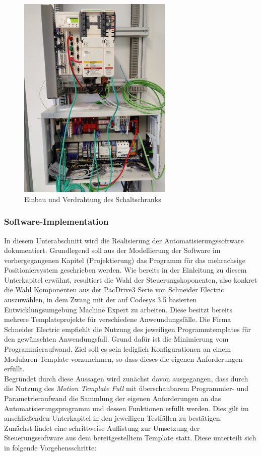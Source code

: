 \documentclass[../../../Bachelorarbeit.tex]{subfiles}
\begin{document}
\begin{figure}[H]
    \centering
    \includegraphics[width=0.66\textwidth]{Images/Schaltschrank.jpg}
    \caption[Schaltschrank]{Einbau und Verdrahtung des Schaltschranks}
    \label{fig:my-img23}
\end{figure}


\subsubsection{Software-Implementation} \label{Softwareimp}
In diesem Unterabschnitt wird die Realisierung der Automatisierungssoftware dokumentiert. Grundlegend soll aus der Modellierung der Software im vorhergegangenen Kapitel (Projektierung) das Programm für das mehrachsige Positioniersystem geschrieben werden. Wie bereits in der Einleitung zu diesem Unterkapitel erwähnt, resultiert die Wahl der Steuerungskoponenten, also konkret die Wahl Komponenten aus der PacDrive3 Serie von Schneider Electric auszuwählen, in dem Zwang mit der auf Codesys 3.5 basierten Entwicklungsumgebung Machine Expert zu arbeiten. Diese besitzt bereits mehrere Templateprojekte für verschiedene Anweundungsfälle. Die Firma Schneider Electric empfiehlt die Nutzung des jeweiligen Programmtemplates für den gewünschten Anwendungsfall. Grund dafür ist die Minimierung vom Programmieraufwand. Ziel soll es sein lediglich Konfigurationen an einem Modularen Template vorzunehmen, so dass dieses die eigenen Anforderungen erfüllt. \\
Begründet durch diese Aussagen wird zunächst davon ausgegangen, dass durch die Nutzung des \textit{Motion Template Full} mit überschaubarem Programmier- und Parametrieraufwand die Sammlung der eigenen Anforderungen an das Automatisierungsprogramm und dessen Funktionen erfüllt werden. Dies gilt im anschließenden Unterkapitel in den jeweiligen Testfällen zu bestätigen. \\
Zunächst findet eine schrittweise Auflistung zur Umsetzung der Steuerungssoftware aus dem bereitgestelltem Template statt. Diese unterteilt sich in folgende Vorgehensschritte:
\end{document}
